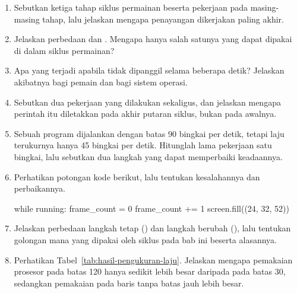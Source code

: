 
\begin{enumerate}
  \item Sebutkan ketiga tahap siklus permainan beserta pekerjaan pada
        masing-masing tahap, lalu jelaskan mengapa penayangan dikerjakan
        paling akhir.

  \item Jelaskan perbedaan  dan
        . Mengapa hanya salah satunya yang dapat
        dipakai di dalam siklus permainan?

  \item Apa yang terjadi apabila  tidak dipanggil
        selama beberapa detik? Jelaskan akibatnya bagi pemain dan bagi sistem
        operasi.

  \item Sebutkan dua pekerjaan yang dilakukan  sekaligus,
        dan jelaskan mengapa perintah itu diletakkan pada akhir putaran
        siklus, bukan pada awalnya.

  \item Sebuah program dijalankan dengan batas 90 bingkai per detik, tetapi
        laju terukurnya hanya 45 bingkai per detik. Hitunglah lama pekerjaan
        satu bingkai, lalu sebutkan dua langkah yang dapat memperbaiki
        keadaannya.

  \item Perhatikan potongan kode berikut, lalu tentukan kesalahannya dan
        perbaikannya.
\begin{kodekeluaran}
while running:
    frame_count = 0
    frame_count += 1
    screen.fill((24, 32, 52))
\end{kodekeluaran}

  \item Jelaskan perbedaan langkah tetap () dan langkah
        berubah (), lalu tentukan golongan mana yang
        dipakai oleh siklus pada bab ini beserta alasannya.

  \item Perhatikan Tabel~\ref{tab:hasil-pengukuran-laju}. Jelaskan mengapa
        pemakaian prosesor pada batas 120 hanya sedikit lebih besar daripada
        pada batas 30, sedangkan pemakaian pada baris tanpa batas jauh lebih
        besar.
\end{enumerate}

